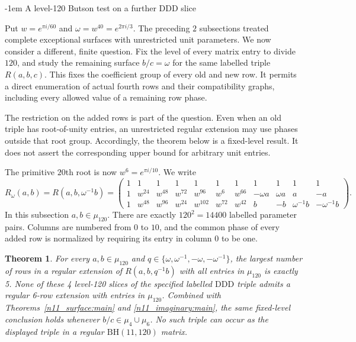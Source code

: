 \documentclass[11pt,a4paper]{article}
\makeatletter
\newtheorem{theorem}{Theorem}[section]
\theoremstyle{plain}
\theoremstyle{definition}
\theoremstyle{plain}
\renewcommand\subsection{\@startsection{subsection}{2}{\z@}  {\medskipamount}  {-1em}  {\normalfont\normalsize\bfseries}}
\makeatother
\begin{document}
\subsection{A level-120 Butson test on a further DDD slice}\label{sec:DDDButson120}

Put $w=e^{\pi i/60}$ and $\omega=w^{40}=e^{2\pi i/3}$. The preceding $2$ subsections treated complete exceptional surfaces with unrestricted unit parameters. We now consider a different, finite question. Fix the level of every matrix entry to divide $120$, and study the remaining surface $b/c=\omega$ for the same labelled triple $R(a,b,c)$. This fixes the coefficient group of every old and new row. It permits a direct enumeration of actual fourth rows and their compatibility graphs, including every allowed value of a remaining row phase.

The restriction on the added rows is part of the question. Even when an old triple has root-of-unity entries, an unrestricted regular extension may use phases outside that root group. Accordingly, the theorem below is a fixed-level result. It does not assert the corresponding upper bound for arbitrary unit entries.

The primitive $20$th root is now $w^6=e^{\pi i/10}$. We write
\[
R_\omega(a,b)=R(a,b,\omega^{-1}b)=
\begin{pmatrix}
1&1&1&1&1&1&1&1&1&1&1\\
1&w^{24}&w^{48}&w^{72}&w^{96}&w^{6}&w^{66}&-\omega a&\omega a&a&-a\\
1&w^{48}&w^{96}&w^{24}&w^{102}&w^{72}&w^{42}&b&-b&\omega^{-1}b&-\omega^{-1}b
\end{pmatrix}.
\]
In this subsection $a,b\in\mu_{120}$. There are exactly $120^2=14400$ labelled parameter pairs. Columns are numbered from $0$ to $10$, and the common phase of every added row is normalized by requiring its entry in column $0$ to be one.

\par\addvspace{\medskipamount}\noindent
\begin{minipage}{\linewidth}
\begin{theorem}\label{n11_bh120:main}
For every $a,b\in\mu_{120}$ and $q\in\{\omega,\omega^{-1},-\omega,-\omega^{-1}\}$, the largest number of rows in a regular extension of $R(a,b,q^{-1}b)$ with all entries in $\mu_{120}$ is exactly 5. None of these 4 level-120 slices of the specified labelled $\mathrm{DDD}$ triple admits a regular 6-row extension with entries in $\mu_{120}$. Combined with Theorems~\ref{n11_surface:main} and \ref{n11_imaginary:main}, the same fixed-level conclusion holds whenever $b/c\in\mu_4\cup\mu_6$. No such triple can occur as the displayed triple in a regular $\mathrm{BH}(11,120)$ matrix.
\end{theorem}
\end{minipage}
\par\addvspace{\medskipamount}
\end{document}
